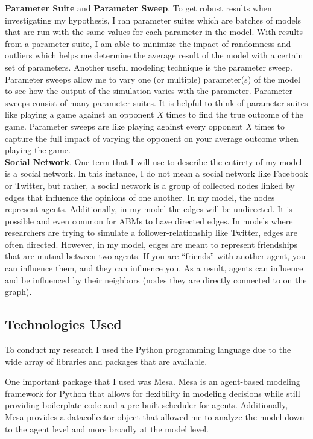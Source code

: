 \textbf{Parameter Suite} and \textbf{Parameter Sweep}. To get robust results when investigating my hypothesis, I ran parameter suites which are batches of models that are run with the same values for each parameter in the model. With results from a parameter suite, I am able to minimize the impact of randomness and outliers which helps me determine the average result of the model with a certain set of parameters. Another useful modeling technique is the parameter sweep. Parameter sweeps allow me to vary one (or multiple) parameter(s) of the model to see how the output of the simulation varies with the parameter. Parameter sweeps consist of many parameter suites. It is helpful to think of parameter suites like playing a game against an opponent \textit{X} times to find the true outcome of the game. Parameter sweeps are like playing against every opponent \textit{X} times to capture the full impact of varying the opponent on your average outcome when playing the game.\\

\textbf{Social Network}. One term that I will use to describe the entirety of my model is a social network. In this instance, I do not mean a social network like Facebook or Twitter, but rather, a social network is a group of collected nodes linked by edges that influence the opinions of one another. In my model, the nodes represent agents. Additionally, in my model the edges will be undirected. It is possible and even common for ABMs to have directed edges. In models where researchers are trying to simulate a follower-relationship like Twitter, edges are often directed. However, in my model, edges are meant to represent friendships that are mutual between two agents. If you are ``friends'' with another agent, you can influence them, and they can influence you. As a result, agents can influence and be influenced by their neighbors (nodes they are directly connected to on the graph). 

\subsection{Technologies Used}
To conduct my research I used the Python programming language due to the wide array of libraries and packages that are available. 

One important package that I used was Mesa. Mesa is an agent-based modeling framework for Python that allows for flexibility in modeling decisions while still providing boilerplate code and a pre-built scheduler for agents. Additionally, Mesa provides a datacollector object that allowed me to analyze the model down to the agent level and more broadly at the model level. 

